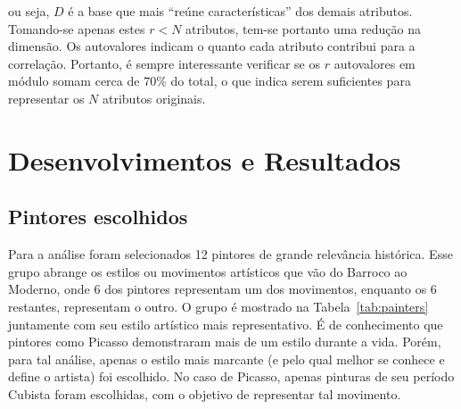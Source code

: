 \noindent ou seja, $D$ é a base que mais ``reúne características'' dos demais
atributos. Tomando-se apenas estes $r < N$ atributos, tem-se portanto uma
redução na dimensão. Os autovalores indicam o quanto cada
atributo contribui para a correlação. Portanto, é sempre interessante verificar se
os $r$ autovalores em módulo somam cerca de $70\%$ do total, o que indica
serem suficientes para representar os $N$ atributos originais.~\cite{luciano}




\chapter{Desenvolvimentos e Resultados}
\label{chap:resultados}


\section{Pintores escolhidos}

Para a análise foram selecionados 12 pintores de grande relevância
histórica. Esse grupo abrange os estilos ou movimentos artísticos que vão do
Barroco ao Moderno, onde 6 dos pintores representam um dos movimentos, enquanto
os 6 restantes, representam o outro. O grupo é mostrado na
Tabela~\ref{tab:painters} juntamente com seu estilo artístico mais
representativo. É de conhecimento que pintores como Picasso
demonstraram mais de um estilo durante a vida. Porém, para tal análise, apenas o
estilo mais marcante (e pelo qual melhor se conhece e define o artista) foi
escolhido. No caso de Picasso, apenas pinturas de seu período Cubista foram
escolhidas, com o objetivo de representar tal movimento.

